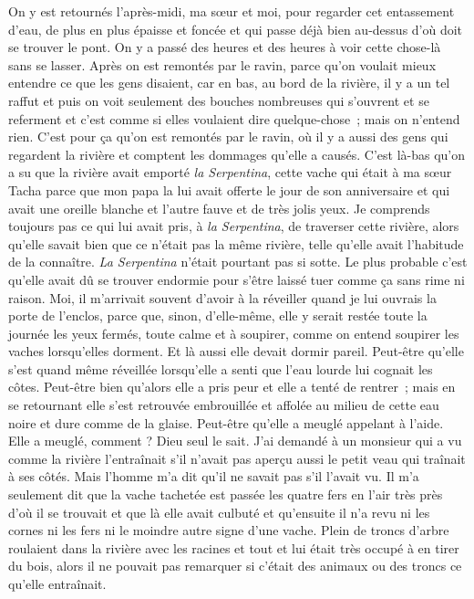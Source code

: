 \pend
%
\pstart
	On y est retournés l’après-midi, ma sœur et moi, pour regarder cet entassement d’eau, de plus en plus épaisse et foncée et qui passe déjà bien au-dessus d’où doit se trouver le pont. On y a passé des heures et des heures à voir cette chose-là sans se lasser. Après on est remontés par le ravin, parce qu’on voulait mieux entendre ce que les gens disaient, car en bas, au bord de la rivière, il y a un tel raffut et puis on voit seulement des bouches nombreuses qui s’ouvrent et se referment et c’est comme si elles voulaient dire quelque-chose ; mais on n’entend rien. C’est pour ça qu’on est remontés par le ravin, où il y a aussi des gens qui regardent la rivière et comptent les dommages qu’elle a causés. C’est là-bas qu’on a su que la rivière avait emporté \textit{la Serpentina}, cette vache qui était à ma sœur Tacha parce que mon papa la lui avait offerte le jour de son anniversaire et qui avait une oreille blanche et l’autre fauve et de très jolis yeux.
\pend
%
\pstart
	Je comprends toujours pas ce qui lui avait pris, à \textit{la Serpentina}, de traverser cette rivière, alors qu’elle savait bien que ce n’était pas la même rivière, telle qu’elle avait l’habitude de la connaître. \textit{La Serpentina} n’était pourtant pas si sotte. Le plus probable c’est qu’elle avait dû se trouver endormie pour s’être laissé tuer comme ça sans rime ni raison. Moi, il m’arrivait souvent d'avoir à la réveiller quand je lui ouvrais la porte de l’enclos, parce que, sinon, d’elle-même, elle y serait restée toute la journée les yeux fermés, toute calme et à soupirer, comme on entend soupirer les vaches lorsqu’elles dorment.
\pend
%
\pstart
	Et là aussi elle devait dormir pareil. Peut-être qu’elle s’est quand même réveillée lorsqu’elle a senti que l’eau lourde lui cognait les côtes. Peut-être bien qu’alors elle a pris peur et elle a tenté de rentrer ; mais en se retournant elle s’est retrouvée embrouillée et affolée au milieu de cette eau noire et dure comme de la glaise. Peut-être qu’elle a meuglé appelant à l’aide.
\pend
%
\pstart
	Elle a meuglé, comment ? Dieu seul le sait.
\pend
%
\pstart
	J’ai demandé à un monsieur qui a vu comme la rivière l’entraînait s’il n’avait pas aperçu aussi le petit veau qui traînait à ses côtés. Mais l’homme m’a dit qu’il ne savait pas s’il l’avait vu. Il m’a seulement dit que la vache tachetée est passée les quatre fers en l’air très près d’où il se trouvait et que là elle avait culbuté et qu’ensuite il n’a revu ni les cornes ni les fers ni le moindre autre signe d’une vache. Plein de troncs d’arbre roulaient dans la rivière avec les racines et tout et lui était très occupé à en tirer du bois, alors il ne pouvait pas remarquer si c’était des animaux ou des troncs ce qu’elle entraînait.

